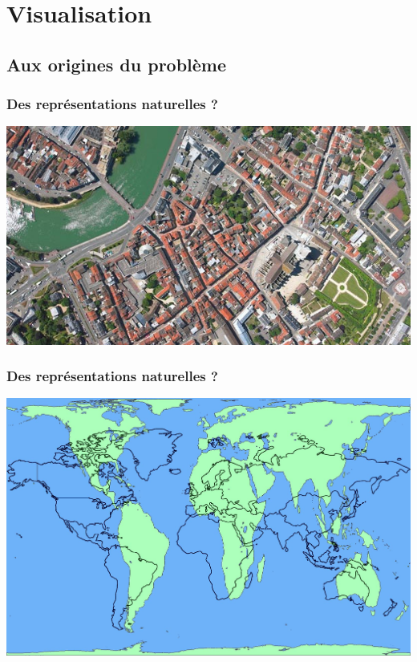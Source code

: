 \documentclass[11pt]{beamer}
\newenvironment{slide}[1]{%
\begin{frame}[environment=slide]
\frametitle{#1}
}{%
\end{frame}
}
\begin{document}
\section{Visualisation}

\subsection{Aux origines du problème}

\begin{slide}{Des représentations naturelles ?}

\includegraphics[scale=0.5]{meaux}


\end{slide}

\begin{slide}{Des représentations naturelles ?}
\begin{center}

\includegraphics[scale=0.15]{projections}

\end{center}
\end{slide}
\end{document}
